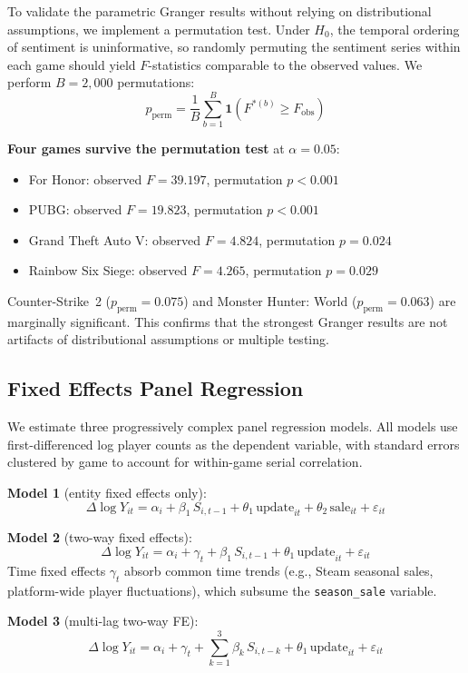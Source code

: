 \documentclass[11pt, letterpaper]{article}
\begin{document}
To validate the parametric Granger results without relying on distributional assumptions, we implement a permutation test.
Under $H_0$, the temporal ordering of sentiment is uninformative, so randomly permuting the sentiment series within each game should yield $F$-statistics comparable to the observed values.
We perform $B = 2{,}000$ permutations:
\[
    p_{\text{perm}} = \frac{1}{B} \sum_{b=1}^{B} \mathbf{1}(F^{*(b)} \geq F_{\text{obs}})
\]

\textbf{Four games survive the permutation test} at $\alpha = 0.05$:
\begin{itemize}[nosep]
    \item For Honor: observed $F = 39.197$, permutation $p < 0.001$
    \item PUBG: observed $F = 19.823$, permutation $p < 0.001$
    \item Grand Theft Auto V: observed $F = 4.824$, permutation $p = 0.024$
    \item Rainbow Six Siege: observed $F = 4.265$, permutation $p = 0.029$
\end{itemize}
Counter-Strike~2 ($p_{\text{perm}} = 0.075$) and Monster Hunter: World ($p_{\text{perm}} = 0.063$) are marginally significant.
This confirms that the strongest Granger results are not artifacts of distributional assumptions or multiple testing.

\subsection{Fixed Effects Panel Regression}\label{sec:panel}

We estimate three progressively complex panel regression models.
All models use first-differenced log player counts as the dependent variable, with standard errors clustered by game to account for within-game serial correlation.

\medskip\noindent\textbf{Model 1} (entity fixed effects only):
\[
    \Delta \log Y_{it} = \alpha_i + \beta_1\, S_{i,t-1} + \theta_1\,\text{update}_{it} + \theta_2\,\text{sale}_{it} + \varepsilon_{it}
\]

\noindent\textbf{Model 2} (two-way fixed effects):
\[
    \Delta \log Y_{it} = \alpha_i + \gamma_t + \beta_1\, S_{i,t-1} + \theta_1\,\text{update}_{it} + \varepsilon_{it}
\]
Time fixed effects $\gamma_t$ absorb common time trends (e.g., Steam seasonal sales, platform-wide player fluctuations), which subsume the \texttt{season\_sale} variable.

\noindent\textbf{Model 3} (multi-lag two-way FE):
\[
    \Delta \log Y_{it} = \alpha_i + \gamma_t + \sum_{k=1}^{3} \beta_k\, S_{i,t-k} + \theta_1\,\text{update}_{it} + \varepsilon_{it}
\]
\end{document}
